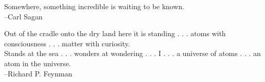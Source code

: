 \documentclass[11pt]{psuthesis}
\begin{document}
\begin{frontmatter}

\clearpage

\vspace*{2.0truein}

\parbox{4.0truein}{
\par\noindent
Somewhere, something incredible is waiting to be known.\\
\hspace*{\fill}--Carl Sagan
}

\vspace{4pc}

\parbox{4.0truein}{
\par\noindent
Out of the cradle onto the dry land here it is standing . . . atoms with consciousness . . . matter with curiosity.\\
Stands at the sea . . . wonders at wondering . . . I . . . a universe of atoms . . . an atom in the universe.\\
\hspace*{\fill}--Richard P. Feynman
}
\end{frontmatter}









%

\appendices








\end{document}
